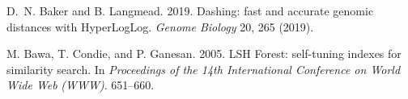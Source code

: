 \documentclass[sigconf, nonacm]{acmart}
\begin{document}

%

\begin{thebibliography}{73}


\ifx \showCODEN    \undefined {}     \fi
\ifx \showDOI      \undefined \def \showDOI       #1{#1}\fi
\ifx \showISBNx    \undefined \def \showISBNx     #1{\unskip}     \fi
\ifx \showISBNxiii \undefined \def \showISBNxiii  #1{\unskip}     \fi
\ifx \showISSN     \undefined \def \showISSN      #1{\unskip}     \fi
\ifx \showLCCN     \undefined \def \showLCCN      #1{\unskip}     \fi
\ifx \shownote     \undefined \def \shownote      #1{#1}          \fi
\ifx \showarticletitle \undefined \def \showarticletitle #1{#1}   \fi
\ifx \showURL      \undefined \def \showURL       {\relax}        \fi
\providecommand\bibfield[2]{#2}
\providecommand\bibinfo[2]{#2}
\providecommand\natexlab[1]{#1}
\providecommand\showeprint[2][]{arXiv:#2}

\bibfield{author}{\bibinfo{person}{D.~N. Baker} {and} \bibinfo{person}{B.
  Langmead}.} \bibinfo{year}{2019}\natexlab{}.
\newblock \showarticletitle{Dashing: fast and accurate genomic distances with
  HyperLogLog}.
\newblock \bibinfo{journal}{\emph{Genome Biology}} \bibinfo{volume}{20},
  \bibinfo{number}{265} (\bibinfo{year}{2019}).
\newblock


\bibfield{author}{\bibinfo{person}{M. Bawa}, \bibinfo{person}{T. Condie}, {and}
  \bibinfo{person}{P. Ganesan}.} \bibinfo{year}{2005}\natexlab{}.
\newblock \showarticletitle{LSH Forest: self-tuning indexes for similarity
  search}. In \bibinfo{booktitle}{\emph{Proceedings of the 14th International
  Conference on World Wide Web}} \emph{(\bibinfo{series}{WWW})}.
  \bibinfo{pages}{651--660}.
\newblock



\end{thebibliography}
\end{document}
